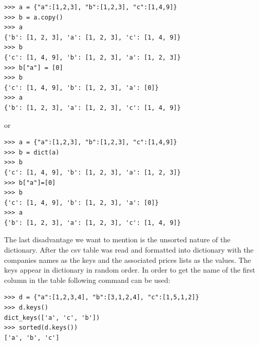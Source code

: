 \documentclass[
  twoside,
  12pt, a4paper,
  footinclude=true,
  headinclude=true,
  cleardoublepage=empty
]{article}
\begin{document}
\begin{verbatim}
>>> a = {"a":[1,2,3], "b":[1,2,3], "c":[1,4,9]}
>>> b = a.copy()
>>> a
{'b': [1, 2, 3], 'a': [1, 2, 3], 'c': [1, 4, 9]}
>>> b
{'c': [1, 4, 9], 'b': [1, 2, 3], 'a': [1, 2, 3]}
>>> b["a"] = [0]
>>> b
{'c': [1, 4, 9], 'b': [1, 2, 3], 'a': [0]}
>>> a
{'b': [1, 2, 3], 'a': [1, 2, 3], 'c': [1, 4, 9]}
\end{verbatim}
or 
\begin{verbatim}
>>> a = {"a":[1,2,3], "b":[1,2,3], "c":[1,4,9]}
>>> b = dict(a)
>>> b
{'c': [1, 4, 9], 'b': [1, 2, 3], 'a': [1, 2, 3]}
>>> b["a"]=[0]
>>> b
{'c': [1, 4, 9], 'b': [1, 2, 3], 'a': [0]}
>>> a
{'b': [1, 2, 3], 'a': [1, 2, 3], 'c': [1, 4, 9]}
\end{verbatim}
The last disadvantage we want to mention is the unsorted nature of the dictionary. After the csv table was read and formatted into dictionary with the companies names as the keys and the associated prices lists as the values. The keys appear in dictionary in random order. In order to get the name of the first column in the table following command can be used:
\begin{verbatim}
>>> d = {"a":[1,2,3,4], "b":[3,1,2,4], "c":[1,5,1,2]}
>>> d.keys()
dict_keys(['a', 'c', 'b'])
>>> sorted(d.keys())
['a', 'b', 'c']
\end{verbatim} 
\end{document}
